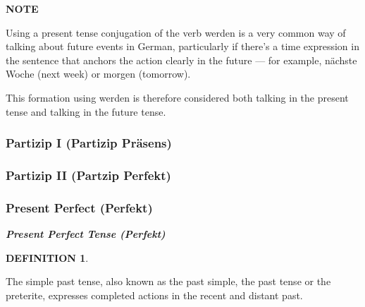 \documentclass[a4paper,twocolumn,10pt]{article}
\newtheorem{mydef}{DEFINITION}[section]
\newcommand{\newpar}
{\par \vspace{0.3cm}}
\newcommand{\subsubsectionend}
{
\nolinenumbers
\linenumbers
}
\newcommand{\tcolorboxstart}
{
	\nolinenumbers
	\vspace{0.2cm}
	\centering
}
\newcommand{\tcolorboxend}
{
	\justifying
	\vspace{0.2cm}
	\linenumbers
}
\newcommand{\tcolorboxdefinition}[3]
{

\tcolorboxstart
\begin{defn-bg}

	\begin{defn-title}[width=7cm]{}
	{
		\normalsize \textbf{\textit{#1}}
	}
	\end{defn-title}

	\begin{defn-theword}
	{
		\footnotesize
		\begin{mydef} #2
		\end{mydef}
	}
	\end{defn-theword}


	\begin{defn-content}

	\justify
	#3

	\end{defn-content}

\end{defn-bg}
\tcolorboxend
}
\newcommand{\tcolorboxnote}[1]
{

\tcolorboxstart
\begin{note-bg}

	\begin{note-theword}
		{\footnotesize \textbf{NOTE} }
	\end{note-theword}

	\begin{note-content} \justifying

		#1

	\end{note-content}

\end{note-bg}
\tcolorboxend
}
\begin{document}


\tcolorboxnote
{

Using a present tense conjugation of the verb werden is a very common way of
talking about future events in German, particularly if there’s a time expression
in the sentence that anchors the action clearly in the future — for example,
nächste Woche (next week) or morgen (tomorrow).\newpar

This formation using werden is therefore considered both talking in the present
tense and talking in the future tense.

}






\subsubsectionend

\subsubsection{Partizip I (Partizip Präsens)}
\label{sssec:partizip_i}



\subsubsectionend

\subsubsection{Partizip II (Partzip Perfekt)}
\label{sssec:partizip_ii}


\subsubsectionend

\subsubsection{Present Perfect (Perfekt)}
\label{sssec:present_perfect}


\tcolorboxdefinition
{Present Perfect Tense (Perfekt)}
{\label{def:present_perfect_tense_perfekt_}}
{


The simple past tense, also known as the past simple, the past tense or the
preterite, expresses completed actions in the recent and distant past.




}
\end{document}
